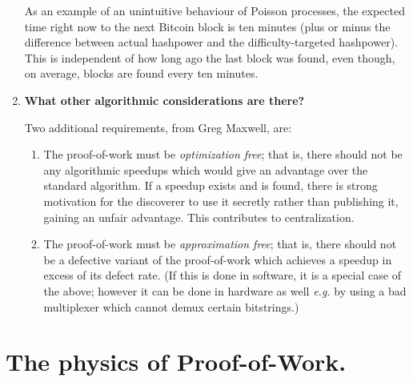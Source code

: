 \documentclass[letterpaper]{article}
\theoremstyle{xxx}
\theoremstyle{evil}
\theoremstyle{yyy}
\theoremstyle{plain}
\theoremstyle{zzz}
\begin{document}
\begin{enumerate}
As an example of an unintuitive behaviour of Poisson processes, the expected time
right now to the next Bitcoin block is ten minutes (plus or minus the difference
between actual hashpower and the difficulty-targeted hashpower). This is independent
of how long ago the last block was found, even though, on average, blocks are found
every ten minutes.

\item \textbf{What other algorithmic considerations are there?}

Two additional requirements, from Greg Maxwell, are:
\begin{enumerate}
\item The proof-of-work must be \emph{optimization free}; that is, there should not
be any algorithmic speedups which would give an advantage over the standard algorithm.
If a speedup exists and is found, there is strong motivation for the discoverer to
use it secretly rather than publishing it, gaining an unfair advantage. This contributes
to centralization.
\item The proof-of-work must be \emph{approximation free}; that is, there should not
be a defective variant of the proof-of-work which achieves a speedup in excess of its
defect rate. (If this is done in software, it is a special case of the above; however
it can be done in hardware as well \emph{e.g.} by using a bad multiplexer which cannot
demux certain bitstrings.)
\end{enumerate}
\end{enumerate}

\section{The physics of Proof-of-Work.}
\end{document}
